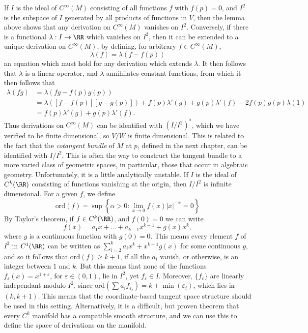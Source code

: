 \begin{remark}
If $I$ is the ideal of $C^\infty(M)$ consisting of all functions $f$ with $f(p) = 0$, and $I^2$ is the subspace of $I$ generated by all products of functions in $V$, then the lemma above shows that any derivation on $C^\infty(M)$ vanishes on $I^2$. Conversely, if there is a functional $\lambda: I \to \RR$ which vanishes on $I^2$, then it can be extended to a unique derivation on $C^\infty(M)$, by defining, for arbitrary $f \in C^\infty(M)$,
%
\[ \lambda(f) = \lambda(f - f(p)) \]
%
an equation which must hold for any derivation which extends $\lambda$. It then follows that $\lambda$ is a linear operator, and $\lambda$ annihilates constant functions, from which it then follows that
%
\begin{align*}
    \lambda(fg) &= \lambda(fg - f(p)g(p))\\
    &= \lambda([f - f(p)][g - g(p)]) + f(p) \lambda'(g) + g(p) \lambda'(f) - 2 f(p) g(p) \lambda(1)\\
    &= f(p) \lambda'(g) + g(p) \lambda'(f).
\end{align*}
%
Thus derivations on $C^\infty(M)$ can be identified with $(I/I^2)^*$, which we have verified to be finite dimensional, so $V/W$ is finite dimensional. This is related to the fact that the \emph{cotangent bundle} of $M$ at $p$, defined in the next chapter, can be identified with $I/I^2$. This is often the way to construct the tangent bundle to a more varied class of geometric spaces, in particular, those that occur in algebraic geometry. Unfortunately, it is a little analytically unstable. If $I$ is the ideal of $C^k(\RR)$ consisting of functions vanishing at the origin, then $I/I^2$ is infinite dimensional. For a given $f$, we define
 \[ \text{ord}(f) = \sup \left\{ \alpha > 0 : \lim_{x \to 0} f(x) |x|^{-\alpha} = 0 \right\} \]
 By Taylor's theorem, if $f \in C^k(\RR)$, and $f(0) = 0$ we can write
 \[ f(x) = a_1x + \dots + a_{k-1} x^{k-1} + g(x) x^k, \]
 where $g$ is a continuous function with $g(0) = 0$. This means every element $f$ of $I^2$ in $C^1(\RR)$ can be written as $\sum_{i = 2}^k a_i x^k + x^{k+1} g(x)$ for some continuous $g$, and so it follows that $\text{ord}(f) \geq k+1$, if all the $a_i$ vanish, or otherwise, is an integer between $1$ and $k$. But this means that none of the functions $f_\varepsilon(x) = x^{1 + \varepsilon}$, for $\varepsilon \in (0,1)$, lie in $I^2$, yet $f_\varepsilon \in I$. Moreover, $\{ f_\varepsilon \}$ are linearly independant modulo $I^2$, since $\text{ord}(\sum a_i f_{\varepsilon_i}) = k + \min(\varepsilon_i)$, which lies in $(k,k+1)$. This means that the coordinate-based tangent space structure should be used in this setting. Alternatively, it is a difficult, but proven theorem that every $C^k$ manifold has a compatible smooth structure, and we can use this to define the space of derivations on the manifold.
\end{remark}

